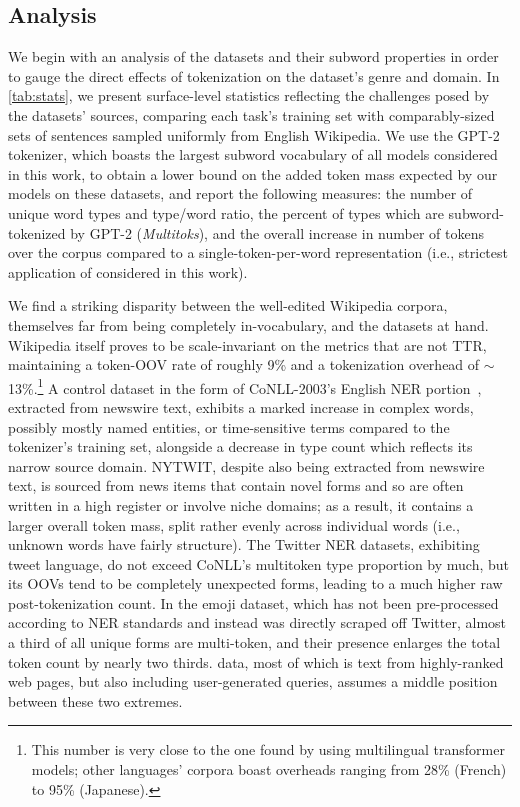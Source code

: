 


\subsection{Analysis}
\label{ssec:stats}

We begin with an analysis of the datasets and their subword properties in order to gauge the direct effects of tokenization on the dataset's genre and domain.
In \autoref{tab:stats}, we present surface-level statistics reflecting the challenges posed by the datasets' sources, comparing each task's training set with comparably-sized sets of sentences sampled uniformly from English Wikipedia.
We use the GPT-2 tokenizer, which boasts the largest subword vocabulary of all models considered in this work, to obtain a lower bound on the added token mass expected by our models on these datasets, and report the following measures: the number of unique word types and type/word ratio, the percent of types which are subword-tokenized by GPT-2 (\textit{Multitoks}), and the overall increase in number of tokens over the corpus compared to a single-token-per-word representation (i.e., strictest application of \tokdetok{} considered in this work).

We find a striking disparity between the well-edited Wikipedia corpora, themselves far from being completely in-vocabulary, and the datasets at hand.
Wikipedia itself proves to be scale-invariant on the metrics that are not TTR, maintaining a token-OOV rate of roughly 9\% and a tokenization overhead of $\sim$13\%.\footnote{This number is very close to the one found by  using multilingual transformer models; other languages' corpora boast overheads ranging from 28\% (French) to 95\% (Japanese).}
A control dataset in the form of CoNLL-2003's English NER portion~\cite{tjong-kim-sang-de-meulder-2003-introduction}, extracted from newswire text, exhibits a marked increase in complex words, possibly mostly named entities, or time-sensitive terms compared to the tokenizer's training set, alongside a decrease in type count which reflects its narrow source domain.
NYTWIT, despite also being extracted from newswire text, is sourced from news items that contain novel forms and so are often written in a high register or involve niche domains; as a result, it contains a larger overall token mass, split rather evenly across individual words (i.e., unknown words have fairly  structure).
The Twitter NER datasets, exhibiting tweet language, do not exceed CoNLL's multitoken type proportion by much, but its OOVs tend to be completely unexpected forms, leading to a much higher raw post-tokenization count.
In the emoji dataset, which has not been pre-processed according to NER standards and instead was directly scraped off Twitter, almost a third of all unique forms are multi-token, and their presence enlarges the total token count by nearly two thirds.
\marco{} data, most of which is text from highly-ranked web pages, but also including user-generated queries, assumes a middle position between these two extremes.





